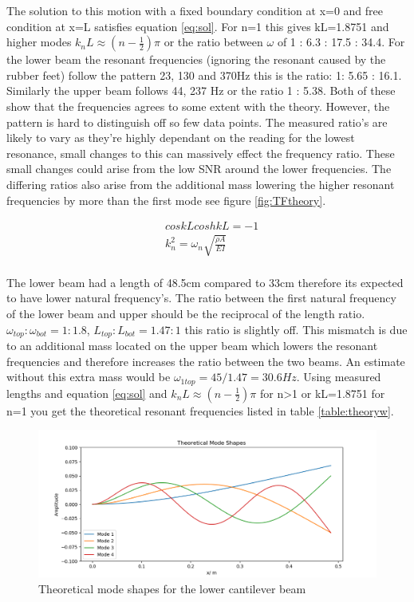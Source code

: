 \documentclass[twoside,onecolumn]{article}
\begin{document}
The solution to this motion with a fixed boundary condition at x=0 and free condition at x=L satisfies equation \ref{eq:sol}. For n=1 this gives kL=1.8751 and higher modes $k_nL \approx (n-\frac{1}{2})\pi$ or the ratio between $\omega$ of 1 : 6.3 : 17.5 : 34.4. 
For the lower beam the resonant frequencies (ignoring the resonant caused by the rubber feet) follow the pattern 23, 130 and 370Hz this is the ratio: 1: 5.65 : 16.1. Similarly the upper beam follows 44, 237 Hz or the ratio 1 : 5.38. Both of these show that the frequencies agrees to some extent with the theory. However, the pattern is hard to distinguish off so few data points. The measured ratio's are likely to vary as they're highly dependant on the reading for the lowest resonance, small changes to this can massively effect the frequency ratio. These small changes could arise from the low SNR around the lower frequencies. The differing ratios also arise from the additional mass lowering the higher resonant frequencies by more than the first mode see figure \ref{fig:TFtheory}.

\begin{equation}
\begin{split}
& coskLcoshkL=-1\\
& k^2_n = \omega_n\sqrt{\frac{\rho A}{EI}}\\
\end{split}
\label{eq:sol}
\end{equation}

 The lower beam had a length of 48.5cm compared to 33cm therefore its expected to have lower natural frequency's. The ratio between the first natural frequency of the lower beam and upper should be the reciprocal of the length ratio. $\omega_{top}:\omega_{bot} = 1:1.8$, $L_{top}:L_{bot}=1.47:1$ this ratio is slightly off. This mismatch is due to an additional mass located on the upper beam which lowers the resonant frequencies and therefore increases the ratio between the two beams. An estimate without this extra mass would be $\omega_{1top}=45/1.47=30.6Hz$.
Using measured lengths and equation \ref{eq:sol} and $k_nL \approx (n-\frac{1}{2})\pi$ for n>1 or kL=1.8751 for n=1 you get the theoretical resonant frequencies listed in table \ref{table:theoryw}.



\begin{figure}[!htb]
  \centering
    \includegraphics[width=\linewidth]{modeshapes}
  \caption{Theoretical mode shapes for the lower cantilever beam}
  \label{fig:modeshape}
\end{figure}
\end{document}
